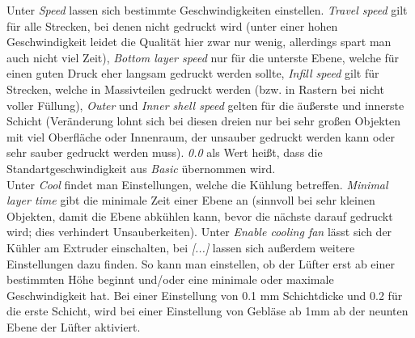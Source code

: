 \documentclass[11pt,a4paper]{scrartcl}
\begin{document}
Unter \textit{Speed} lassen sich bestimmte Geschwindigkeiten einstellen. \textit{Travel speed} gilt für alle Strecken, bei denen nicht gedruckt wird (unter einer hohen Geschwindigkeit leidet die Qualität hier zwar nur wenig, allerdings spart man auch nicht viel Zeit), \textit{Bottom layer speed} nur für die unterste Ebene, welche für einen guten Druck eher langsam gedruckt werden sollte, \textit{Infill speed} gilt für Strecken, welche in Massivteilen gedruckt werden (bzw. in Rastern bei nicht voller Füllung), \textit{Outer} und \textit{Inner shell speed} gelten für die äußerste und innerste Schicht (Veränderung lohnt sich bei diesen dreien nur bei sehr großen Objekten mit viel Oberfläche oder Innenraum, der unsauber gedruckt werden kann oder sehr sauber gedruckt werden muss). \textit{0.0} als Wert heißt, dass die Standartgeschwindigkeit aus \textit{Basic} übernommen wird. \\
Unter \textit{Cool} findet man Einstellungen, welche die Kühlung betreffen. \textit{Minimal layer time} gibt die minimale Zeit einer Ebene an (sinnvoll bei sehr kleinen Objekten, damit die Ebene abkühlen kann, bevor die nächste darauf gedruckt wird; dies verhindert Unsauberkeiten). Unter \textit{Enable cooling fan} lässt sich der Kühler am Extruder einschalten, bei \textit{[...]} lassen sich außerdem weitere Einstellungen dazu finden. So kann man einstellen, ob der Lüfter erst ab einer bestimmten Höhe beginnt und/oder eine minimale oder maximale Geschwindigkeit hat. Bei einer Einstellung von 0.1 mm Schichtdicke und 0.2 für die erste Schicht, wird bei einer Einstellung von Gebläse ab 1mm ab der neunten Ebene der Lüfter aktiviert.
\end{document}

